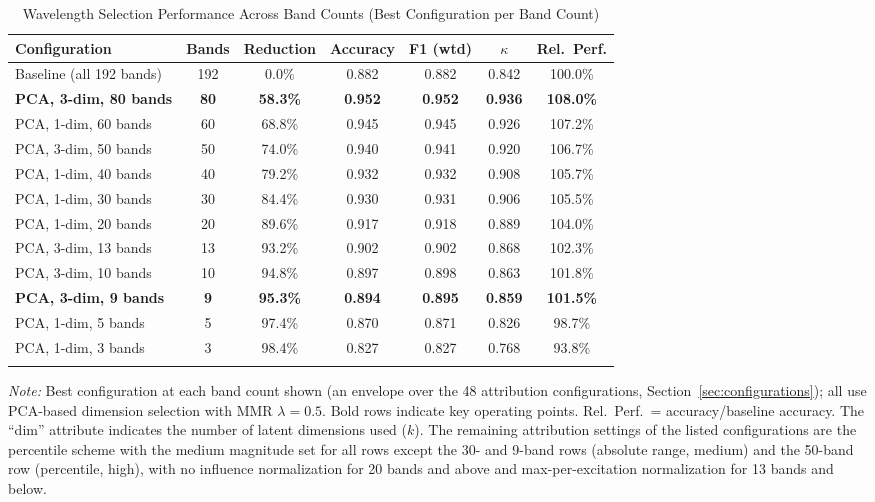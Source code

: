 \begin{table}[!t]
\centering
\caption{Wavelength Selection Performance Across Band Counts (Best Configuration per Band Count)}
\label{tab:main_results}
\begin{tabular}{@{}lcccccc@{}}
\toprule
\textbf{Configuration} & \textbf{Bands} & \textbf{Reduction} & \textbf{Accuracy} & \textbf{F1 (wtd)} & \textbf{$\kappa$} & \textbf{Rel.\ Perf.} \\
\midrule
Baseline (all 192 bands) & 192 & 0.0\% & 0.882 & 0.882 & 0.842 & 100.0\% \\
\midrule
\textbf{PCA, 3-dim, 80 bands} & \textbf{80} & \textbf{58.3\%} & \textbf{0.952} & \textbf{0.952} & \textbf{0.936} & \textbf{108.0\%} \\
PCA, 1-dim, 60 bands & 60 & 68.8\% & 0.945 & 0.945 & 0.926 & 107.2\% \\
PCA, 3-dim, 50 bands & 50 & 74.0\% & 0.940 & 0.941 & 0.920 & 106.7\% \\
PCA, 1-dim, 40 bands & 40 & 79.2\% & 0.932 & 0.932 & 0.908 & 105.7\% \\
PCA, 1-dim, 30 bands & 30 & 84.4\% & 0.930 & 0.931 & 0.906 & 105.5\% \\
PCA, 1-dim, 20 bands & 20 & 89.6\% & 0.917 & 0.918 & 0.889 & 104.0\% \\
PCA, 3-dim, 13 bands & 13 & 93.2\% & 0.902 & 0.902 & 0.868 & 102.3\% \\
PCA, 3-dim, 10 bands & 10 & 94.8\% & 0.897 & 0.898 & 0.863 & 101.8\% \\
\textbf{PCA, 3-dim, 9 bands} & \textbf{9} & \textbf{95.3\%} & \textbf{0.894} & \textbf{0.895} & \textbf{0.859} & \textbf{101.5\%} \\
PCA, 1-dim, 5 bands & 5 & 97.4\% & 0.870 & 0.871 & 0.826 & 98.7\% \\
PCA, 1-dim, 3 bands & 3 & 98.4\% & 0.827 & 0.827 & 0.768 & 93.8\% \\
\bottomrule
\vspace{0.2em}
\end{tabular}
\parbox{\textwidth}{\small\textit{Note:} Best configuration at each band count shown (an envelope over the 48 attribution configurations, Section~\ref{sec:configurations}); all use PCA-based dimension selection with MMR $\lambda = 0.5$. Bold rows indicate key operating points. Rel.\ Perf.\ = accuracy/baseline accuracy. The ``dim'' attribute indicates the number of latent dimensions used ($k$). The remaining attribution settings of the listed configurations are the percentile scheme with the medium magnitude set for all rows except the 30- and 9-band rows (absolute range, medium) and the 50-band row (percentile, high), with no influence normalization for 20 bands and above and max-per-excitation normalization for 13 bands and below.}
\end{table}

